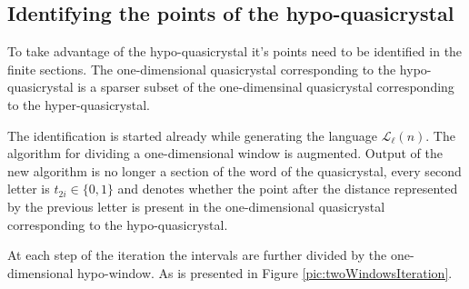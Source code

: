 \documentclass[text.tex]{subfiles}
\begin{document}
\subsection{Identifying the points of the hypo-quasicrystal}
To take advantage of the hypo-quasicrystal it's points need to be identified in the finite sections. The one-dimensional quasicrystal corresponding to the hypo-quasicrystal is a sparser subset of the one-dimensinal quasicrystal corresponding to the hyper-quasicrystal. 

The identification is started already while generating the language $\mathcal{L}_\ell(n)$. The algorithm for dividing a one-dimensional window is augmented. Output of the new algorithm is no longer a section of the word of the quasicrystal, every second letter is $t_{2i}\in\{0,1\}$ and denotes whether the point after the distance represented by the previous letter is present in the one-dimensional quasicrystal corresponding to the hypo-quasicrystal. 

At each step of the iteration the intervals are further divided by the one-dimensional hypo-window. As is presented in Figure \ref{pic:twoWindowsIteration}.
\end{document}
